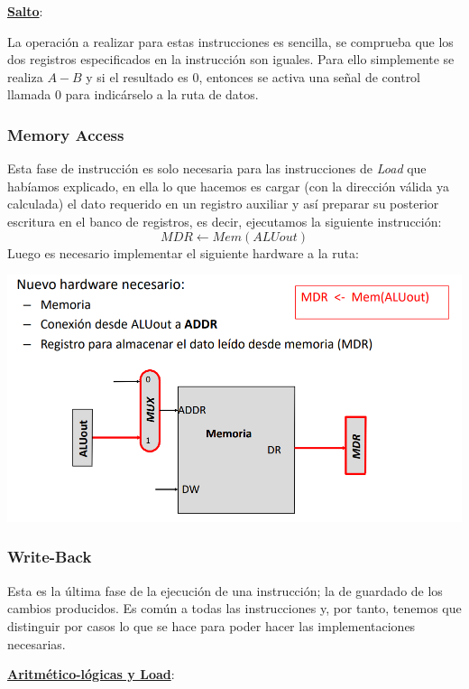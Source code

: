 \documentclass[a4paper,10pt]{book}
\begin{document}
\underline{\textbf{Salto}}:

La operación a realizar para estas instrucciones es sencilla, se comprueba que los dos registros especificados en la instrucción son iguales. Para ello simplemente se realiza $A-B$ y si el resultado es $0$, entonces se activa una señal de control llamada 0 para indicárselo a la ruta de datos.

\subsubsection*{Memory Access}
Esta fase de instrucción es solo necesaria para las instrucciones de \textit{Load} que habíamos explicado, en ella lo que hacemos es cargar (con la dirección válida ya calculada) el dato requerido en un registro auxiliar y así preparar su posterior escritura en el banco de registros, es decir, ejecutamos la siguiente instrucción:
$$MDR \leftarrow Mem(ALUout)$$
Luego es necesario implementar el siguiente hardware a la ruta:
\begin{center}
\includegraphics[scale=0.5]{acceso memoria}
\end{center}

\subsubsection*{Write-Back}
Esta es la última fase de la ejecución de una instrucción; la de guardado de los cambios producidos. Es común a todas las instrucciones y, por tanto, tenemos que distinguir por casos lo que se hace para poder hacer las implementaciones necesarias.

\underline{\textbf{Aritmético-lógicas y Load}}:
\end{document}
